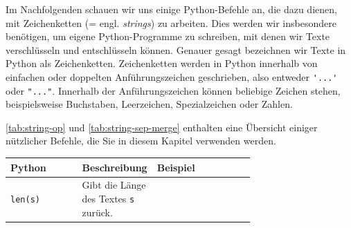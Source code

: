 Im Nachfolgenden schauen wir uns einige Python-Befehle an, die dazu dienen, mit Zeichenketten (= engl. \textit{strings}) zu arbeiten. Dies werden wir insbesondere benötigen, um eigene Python-Programme zu schreiben, mit denen wir Texte verschlüsseln und entschlüsseln können. Genauer gesagt bezeichnen wir Texte in Python als Zeichenketten. Zeichenketten werden in Python innerhalb von einfachen oder doppelten Anführungszeichen geschrieben, also entweder \lstinline|'...'| oder \lstinline|"..."|. Innerhalb der Anführungszeichen können beliebige Zeichen stehen, beispielsweise Buchstaben, Leerzeichen, Spezialzeichen oder Zahlen.


\cref{tab:string-op} und \cref{tab:string-sep-merge} enthalten eine Übersicht einiger nützlicher Befehle, die Sie in diesem Kapitel verwenden werden.

\begin{table}[H]
 \centering
\begin{tabular}{l|p{0.3\linewidth}|p{0.4\linewidth}}
\textbf{Python} & \textbf{Beschreibung} & \textbf{Beispiel} \\\midrule\midrule
\lstinline|len(s)| & Gibt die Länge des Textes \lstinline|s| zurück. & 


\end{tabular}
\end{table}
